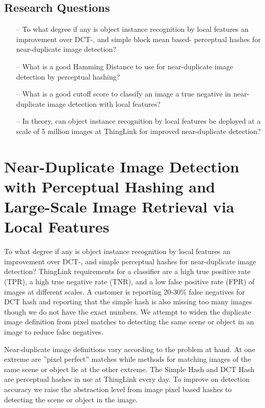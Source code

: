 \documentclass[english,12pt,a4paper,pdftex,elec,utf8, table]{aaltothesis}
\begin{document}
\subsection{Research Questions}
\begin{itemize}
\item[--] To what degree if any is object instance recognition by local features an improvement over DCT-, and simple block mean based- perceptual hashes for near-duplicate image detection?
\item[--] What is a good Hamming Distance to use for near-duplicate image detection by perceptual hashing?
\item[--] What is a good cutoff score to classify an image a true negative in near-duplicate image detection with local features?
\item[--] In theory, can object instance recognition by local features be deployed at a scale of 5 million images at ThingLink for improved near-duplicate detection?
\end{itemize}

\clearpage

\section{Near-Duplicate Image Detection with Perceptual Hashing and \\Large-Scale Image Retrieval via Local Features}
To what degree if any is object instance recognition by local features an improvement over DCT-, and simple perceptual hashes for near-duplicate image detection? ThingLink requirements for a classifier are a high true positive rate (TPR), a high true negative rate (TNR), and a low false positive rate (FPR) of images at different scales. A customer is reporting 20-30\% false negatives for DCT hash and reporting that the simple hash is also missing too many images though we do not have the exact numbers. We attempt to widen the duplicate image definition from pixel matches to detecting the same scene or object in an image to reduce false negatives.

Near-duplicate image definitions vary according to the problem at hand. At one extreme are ''pixel perfect'' matches while methods for matching images of the same scene or object lie at the other extreme. The Simple Hash and DCT Hash are perceptual hashes in use at ThingLink every day. To improve on detection accuracy we raise the abstraction level from image pixel based hashes to detecting the scene or object in the image.
\end{document}
